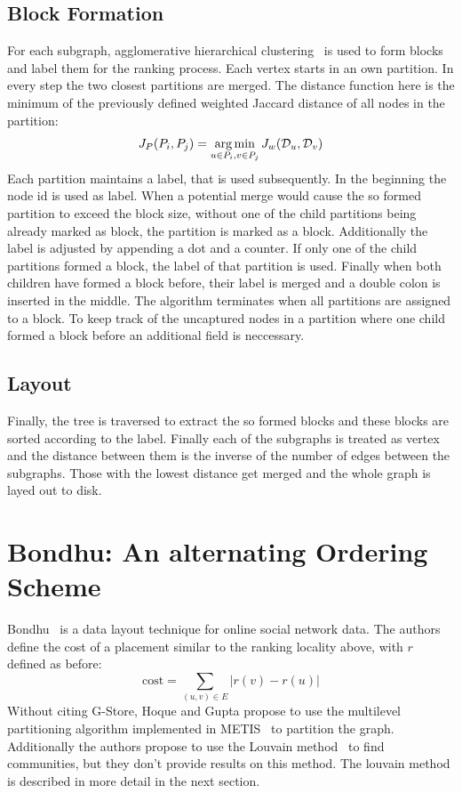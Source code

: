     \subsection*{Block Formation}
    For each subgraph, agglomerative hierarchical clustering~\autocite{hac} is used to form blocks and label them for the ranking process.
    Each vertex starts in an own partition. 
    In every step the two closest partitions are merged. 
    The distance function here is the minimum of the previously defined weighted Jaccard distance of all nodes in the partition:
    \[ J_P (P_i, P_j) = \operatorname*{arg\,min}_{u \in P_i, v \in P_j} J_w (\mathcal{D}_u, \mathcal{D}_v) \]
    Each partition maintains a label, that is used subsequently.
    In the beginning the node id is used as label. 
    When a potential merge would cause the so formed partition to exceed the block size, without one of the child partitions being already marked as block, the partition is marked as a block.
    Additionally the label is adjusted by appending a dot and a counter.
    If only one of the child partitions formed a block, the label of that partition is used.
    Finally when both children have formed a block before, their label is merged and a double colon is inserted in the middle.
    The algorithm terminates when all partitions are assigned to a block.
    To keep track of the uncaptured nodes in a partition where one child formed a block before an additional field is neccessary.    
    
    
    \subsection*{Layout}
    Finally, the tree is traversed to extract the so formed blocks and these blocks are sorted according to the label. 
    Finally each of the subgraphs is treated as vertex and the distance between them is the inverse of the number of edges between the subgraphs. Those with the lowest distance get merged and the whole graph is layed out to disk.
    

\section{Bondhu: An alternating Ordering Scheme}
    Bondhu~\autocite{hoque2012disk} is a data layout technique for online social network data. 
    The authors define the cost of a placement similar to the ranking locality above, with $r$ defined as before: \[ \text{cost} = \sum_{(u, v) \in E} |r(v) - r(u)| \]   
    Without citing G-Store, Hoque and Gupta propose to use the multilevel partitioning algorithm implemented in METIS~\autocite{karypis} to partition the graph. Additionally the authors propose to use the Louvain method~\autocite{blondel2008fast} to find communities, but they don't provide results on this method. The louvain method is described in more detail in the next section. \\
    
